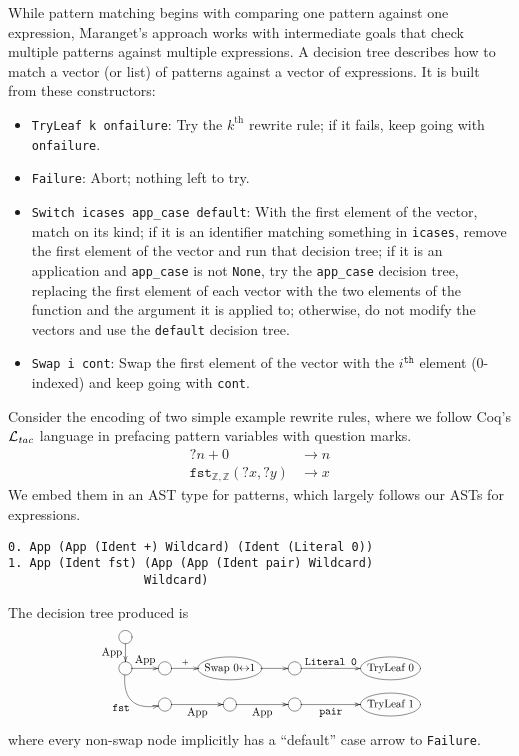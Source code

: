 \documentclass[sigplan,10pt,review,anonymous]{acmart}\settopmatter{printfolios=true,printccs=false,printacmref=false}
\newcommand{\Ltac}{\ensuremath{\mathcal{L}_\text{\emph{tac}}}}
\begin{document}
While pattern matching begins with comparing one pattern against one expression, Maranget's approach works with intermediate goals that check multiple patterns against multiple expressions.
A decision tree describes how to match a vector (or list) of patterns against a vector of expressions.
It is built from these constructors:
\begin{itemize}
  \item \texttt{TryLeaf k onfailure}: Try the $k^\text{th}$ rewrite rule; if it fails, keep going with \texttt{onfailure}.
  \item \texttt{Failure}: Abort; nothing left to try.
  \item \texttt{Switch icases app\_case default}:
    With the first element of the vector, match on its kind; if it is an identifier matching something in \texttt{icases}, remove the first element of the vector and run that decision tree; if it is an application and \texttt{app\_case} is not \texttt{None}, try the \texttt{app\_case} decision tree, replacing the first element of each vector with the two elements of the function and the argument it is applied to; otherwise, do not modify the vectors and use the \texttt{default} decision tree.
  \item \texttt{Swap i cont}: Swap the first element of the vector with the $i^\texttt{th}$ element (0-indexed) and keep going with \texttt{cont}.
\end{itemize}

Consider the encoding of two simple example rewrite rules, where we follow Coq's \Ltac{} language in prefacing pattern variables with question marks.
\begin{align*}
  ?n + 0 & \to n \\
  \texttt{fst}_{\mathbb{Z},\mathbb{Z}}(?x, ?y) & \to x
\end{align*}
We embed them in an AST type for patterns, which largely follows our ASTs for expressions.
\begin{verbatim}
0. App (App (Ident +) Wildcard) (Ident (Literal 0))
1. App (Ident fst) (App (App (Ident pair) Wildcard)
                   Wildcard)
\end{verbatim}
The decision tree produced is \label{sec:compiled-pattern}
\[\resizebox{230px}{!}{\xymatrix@R-1pc{
  *++[o][F-]\txt{} \ar[d]_{\txt{App}} \\
  *++[o][F-]\txt{} \ar[r]^-{\txt{App}} \ar@/_1.5pc/[dr]_{\txt{\texttt{fst}}} & *++[o][F-]\txt{} \ar[r]^-{+} & *++[o][F-]\txt{Swap 0$\leftrightarrow$1} \ar[r] & *++[o][F-]\txt{} \ar[rr]^-{\txt{\texttt{Literal~0}}} && *++[o][F-]\txt{TryLeaf 0} \\
  & *++[o][F-]\txt{} \ar[r]_-{\txt{App}} & *++[o][F-]\txt{} \ar[r]_-{\txt{App}} & *++[o][F-]\txt{} \ar[rr]_-{\txt{\texttt{pair}}} && *++[o][F-]\txt{TryLeaf 1}
}}\]
\noindent where every non-swap node implicitly has a ``default'' case arrow to \texttt{Failure}.
\end{document}
